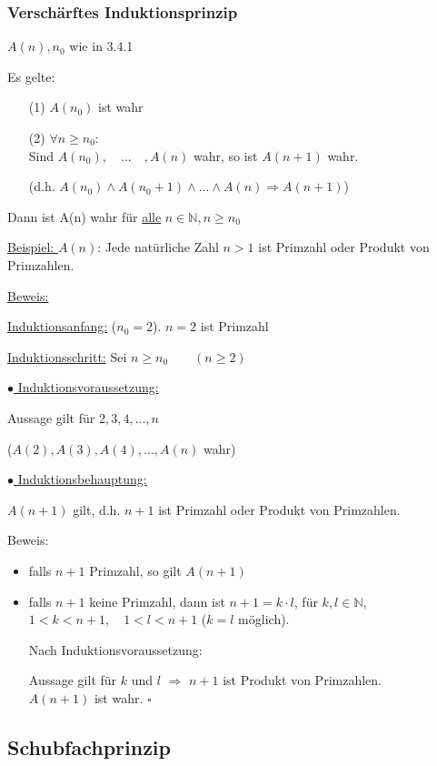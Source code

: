 \documentclass[a4paper, 12pt, twoside] {article}
\begin{document}
\subsubsection{Verschärftes Induktionsprinzip} %

$A(n), n_0$ wie in 3.4.1

Es gelte:
\begin{itemize}
	\item[(1)] $A(n_0)$ ist wahr
	\item[(2)] $\forall n \geq n_0:$ \\
	Sind $A(n_0), \quad ... \quad , A(n)$ wahr, so ist $A(n+1)$ wahr.
	
	(d.h. $A(n_0) \land A(n_0+1) \land ... \land A(n) \Rightarrow A(n+1)$)
\end{itemize}
Dann ist A(n) wahr für \underline{alle} $n \in \mathbb{N}, n \geq n_0$

\hfill

\underline{Beispiel: } $A(n)$: Jede natürliche Zahl $n > 1$ ist Primzahl oder Produkt von Primzahlen.

\underline{Beweis:}

\underline{Induktionsanfang:} ($n_0=2$). $n=2$ ist Primzahl \checkmark

\underline{Induktionsschritt:} Sei $n \geq n_0 \qquad (n \geq 2)$

\underline{$\bullet$ Induktionsvoraussetzung:}

Aussage gilt für $2,3,4,...,n$

($A(2),A(3),A(4),...,A(n)$ wahr)

\underline{$\bullet$ Induktionsbehauptung:}

$A(n+1)$ gilt, d.h. $n+1$ ist Primzahl oder Produkt von Primzahlen.

Beweis:

\begin{itemize}
\item falls $n+1$ Primzahl, so gilt $A(n+1)$
\item falls $n+1$ keine Primzahl, dann ist $n+1 = k \cdot l$, für $k,l \in \mathbb{N}$, \\
$1 < k < n+1, \quad 1 < l < n+1$ ($k=l$ möglich).

Nach Induktionsvoraussetzung:

Aussage gilt für $k$ und $l$ $\Rightarrow$ $n+1$ ist Produkt von Primzahlen. \\
$A(n+1)$ ist wahr. \hfill $\square$
\end{itemize}


\subsection{Schubfachprinzip} %
\end{document}
